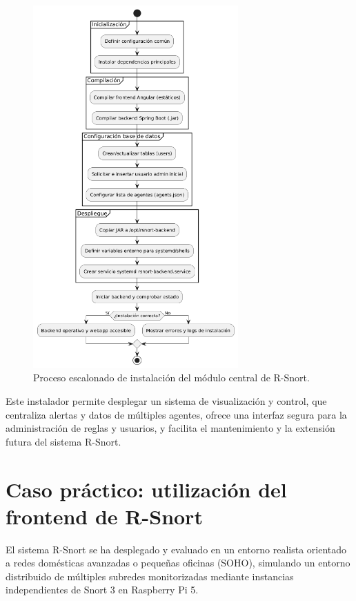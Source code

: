 \documentclass[11pt,a4paper,twoside]{report}
\begin{document}
\begin{figure}[H]
	\centering
	\includegraphics[width=0.7\textwidth]{documento/30.png}
	\caption{Proceso escalonado de instalación del módulo central de R-Snort.}
	\label{fig:bpmn-snort-central}
\end{figure}

Este instalador permite desplegar un sistema de visualización y control, que centraliza alertas y datos de múltiples agentes, ofrece una interfaz segura para la administración de reglas y usuarios, y facilita el mantenimiento y la extensión futura del sistema R-Snort.


\clearpage
\null
\thispagestyle{empty}
\newpage
\chapter{Caso práctico: utilización del frontend de R-Snort}

El sistema R-Snort se ha desplegado y evaluado en un entorno realista orientado a redes domésticas avanzadas o pequeñas oficinas (SOHO), simulando un entorno distribuido de múltiples subredes monitorizadas mediante instancias independientes de Snort 3 en Raspberry Pi 5.
\end{document}
